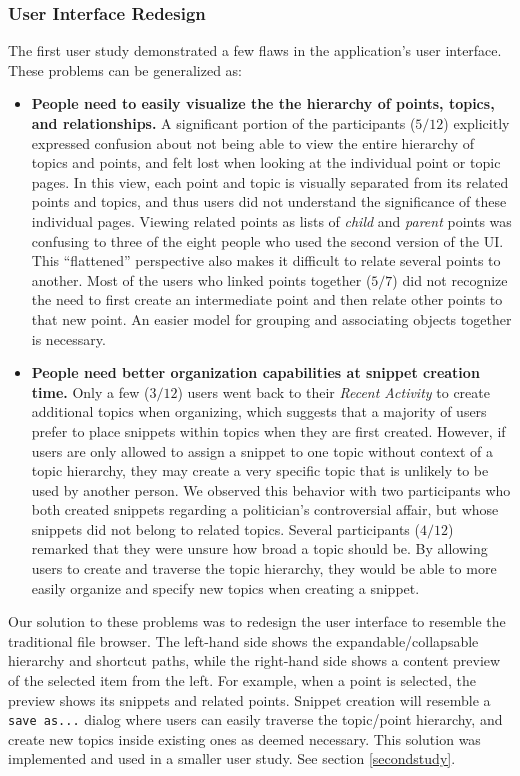 \documentclass{chi2009}
\begin{document}
\subsubsection{User Interface Redesign}
The first user study demonstrated a few flaws in the application's user interface. These problems can be generalized as:
\begin{itemize}
	\item \textbf{People need to easily visualize the the hierarchy of points, topics, and relationships.} A significant portion of the participants ($5/12$) explicitly expressed confusion about not being able to view the entire hierarchy of topics and points, and felt lost when looking at the individual point or topic pages. In this view, each point and topic is visually separated from its related points and topics, and thus users did not understand the significance of these individual pages. Viewing related points as lists of {\it child} and {\it parent} points was confusing to three of the eight people who used the second version of the UI. This ``flattened'' perspective also makes it difficult to relate several points to another. Most of the users who linked points together ($5/7$) did not recognize the need to first create an intermediate point and then relate other points to that new point. An easier model for grouping and associating objects together is necessary.
	\item \textbf{People need better organization capabilities at snippet creation time.} Only a few ($3/12$) users went back to their {\it Recent Activity} to create additional topics when organizing, which suggests that a majority of users prefer to place snippets within topics when they are first created. However, if users are only allowed to assign a snippet to one topic without context of a topic hierarchy, they may create a very specific topic that is unlikely to be used by another person. We observed this behavior with two participants who both created snippets regarding a politician's controversial affair, but whose snippets did not belong to related topics. Several participants ($4/12$) remarked that they were unsure how broad a topic should be. By allowing users to create and traverse the topic hierarchy, they would be able to more easily organize and specify new topics when creating a snippet.
\end{itemize}

Our solution to these problems was to redesign the user interface to resemble the traditional file browser. The left-hand side shows the expandable/collapsable hierarchy and shortcut paths, while the right-hand side shows a content preview of the selected item from the left. For example, when a point is selected, the preview shows its snippets and related points. Snippet creation will resemble a \texttt{save as...} dialog where users can easily traverse the topic/point hierarchy, and create new topics inside existing ones as deemed necessary.
This solution was implemented and used in a smaller user study. See section \ref{secondstudy}.
\end{document}
